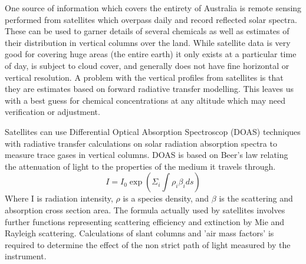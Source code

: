 One source of information which covers the entirety of Australia is remote sensing performed from satellites which overpass daily and record reflected solar spectra.
These can be used to garner details of several chemicals as well as estimates of their distribution in vertical columns over the land.
While satellite data is very good for covering huge areas (the entire earth) it only exists at a particular time of day, is subject to cloud cover, and generally does not have fine horizontal or vertical resolution.
A problem with the vertical profiles from satellites is that they are estimates based on forward radiative transfer modelling.
This leaves us with a best guess for chemical concentrations at any altitude which may need verification or adjustment.

Satellites can use Differential Optical Absorption Spectroscop (DOAS) techniques with radiative transfer calculations on solar radiation absorption spectra to measure trace gases in vertical columns.
DOAS is based on Beer's law relating the attenuation of light to the properties of the medium it travels through. 
$$ I = I_0 \exp \left( \Sigma_i \int \rho_i \beta_i ds \right) $$
Where I is radiation intensity, $\rho$ is a species density, and $\beta$ is the scattering and absorption cross section area.
The formula actually used by satellites involves further functions representing scattering efficiency and extinction by Mie and Rayleigh scattering.
Calculations of slant columns and 'air mass factors' is required to determine the effect of the non strict path of light measured by the instrument.